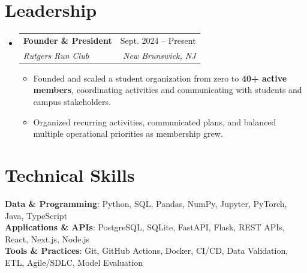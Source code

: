 \documentclass[letterpaper,10pt]{article}
\makeatletter
\newcommand{\resumeItem}[1]{\item\small{{#1}}}
\newcommand{\resumeSubheading}[4]{
  \vspace{-1pt}\item
  \begin{tabular*}{0.97\textwidth}[t]{l@{\extracolsep{\fill}}r}
    \textbf{#1} & #2 \\
    \textit{\small#3} & \textit{\small #4} \\
  \end{tabular*}\vspace{-6pt}
}
\newcommand{\resumeSubHeadingListStart}{\begin{itemize}[leftmargin=0.15in, label={}]}
\newcommand{\resumeSubHeadingListEnd}{\end{itemize}}
\newcommand{\resumeItemListStart}{\begin{itemize}[leftmargin=0.15in, itemsep=-3pt, topsep=0pt]}
\newcommand{\resumeItemListEnd}{\end{itemize}\vspace{-3pt}}
\makeatother
\begin{document}
\section{Leadership}
\resumeSubHeadingListStart
  \resumeSubheading
    {Founder \& President}{Sept. 2024 -- Present}
    {Rutgers Run Club}{New Brunswick, NJ}
    \resumeItemListStart
      \resumeItem{Founded and scaled a student organization from zero to \textbf{40+ active members}, coordinating activities and communicating with students and campus stakeholders.}
      \resumeItem{Organized recurring activities, communicated plans, and balanced multiple operational priorities as membership grew.}
    \resumeItemListEnd
\resumeSubHeadingListEnd

\section{Technical Skills}
\begin{itemize}[leftmargin=0.15in, label={}]
  \small{\item{
    \textbf{Data \& Programming}{: Python, SQL, Pandas, NumPy, Jupyter, PyTorch, Java, TypeScript} \\
    \textbf{Applications \& APIs}{: PostgreSQL, SQLite, FastAPI, Flask, REST APIs, React, Next.js, Node.js} \\
    \textbf{Tools \& Practices}{: Git, GitHub Actions, Docker, CI/CD, Data Validation, ETL, Agile/SDLC, Model Evaluation}
  }}
\end{itemize}
\end{document}
